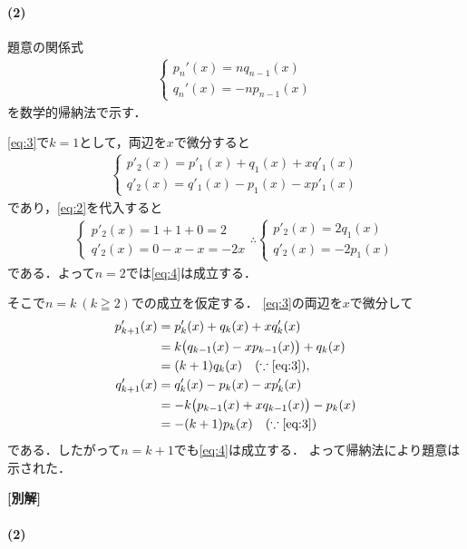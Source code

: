 \documentclass[../../main.tex]{subfiles}
\begin{document}
\paragraph{(2)}

題意の関係式
\begin{align}
  \begin{cases}
    {p_n}'(x)=nq_{n-1}(x) \\
    {q_n}'(x)=-np_{n-1}(x)
  \end{cases} \label{eq:4}
\end{align}
を数学的帰納法で示す．

\cref{eq:3}で$k=1$として，両辺を$x$で微分すると
\begin{align}
  \begin{cases}
    p'_2(x) = p'_1(x) + q_1(x) + xq'_1(x) \\
    q'_2(x) = q'_1(x) - p_1(x) - xp'_1(x)
  \end{cases} \label{eq:5}
\end{align}
であり，\cref{eq:2}を代入すると
\begin{align}
  \begin{cases}
    p'_2(x) = 1 + 1 + 0 = 2  \\
    q'_2(x) = 0 - x - x = -2x
  \end{cases}
  \therefore
  \begin{cases}
    p'_2(x) = 2q_1(x)  \\
    q'_2(x) = -2p_1(x)
  \end{cases}
\end{align}
である．よって$n=2$では\cref{eq:4}は成立する．

そこで$n=k \ (k\geqq 2)$での成立を仮定する．
\cref{eq:3}の両辺を$x$で微分して
\begin{align}
  p_{k+1}'(x)
  &=p_k'(x)+q_k(x)+xq_k'(x)\\
  &=k\bigl(q_{k-1}(x)-xp_{k-1}(x)\bigr)+q_k(x)\\
  &=(k+1)q_k(x) \quad (\because\text{\cref{eq:3}}),\\
  q_{k+1}'(x)
  &=q_k'(x)-p_k(x)-xp_k'(x)\\
  &=-k\bigl(p_{k-1}(x)+xq_{k-1}(x)\bigr)-p_k(x)\\
  &=-(k+1)p_k(x) \quad (\because\text{\cref{eq:3}})
\end{align}
である．したがって$n=k+1$でも\cref{eq:4}は成立する．
よって帰納法により題意は示された．

{\bf [別解]}

\paragraph{(2)}
\end{document}
